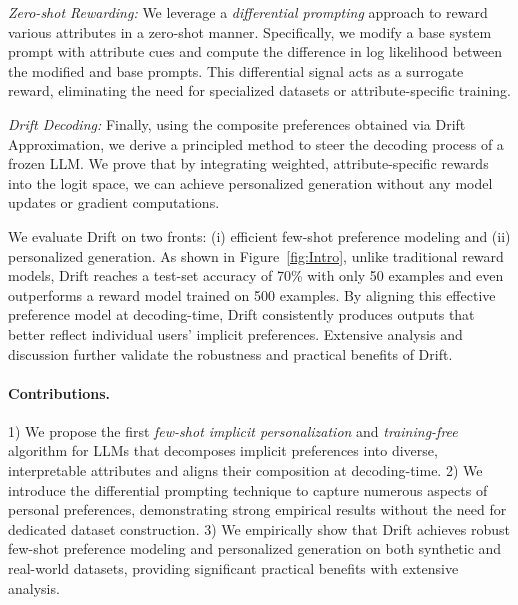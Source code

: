 \noindent \textit{Zero-shot Rewarding:} We leverage a \textit{differential prompting} approach to reward various attributes in a zero-shot manner. Specifically, we modify a base system prompt with attribute cues and compute the difference in log likelihood between the modified and base prompts. This differential signal acts as a surrogate reward, eliminating the need for specialized datasets or attribute-specific training.

\noindent
\textit{Drift Decoding:} Finally, using the composite preferences obtained via Drift Approximation, we derive a principled method to steer the decoding process of a frozen LLM. We prove that by integrating weighted, attribute-specific rewards into the logit space, we can achieve personalized generation without any model updates or gradient computations. 

We evaluate Drift on two fronts: (i) efficient few-shot preference modeling and (ii) personalized generation. As shown in Figure~\ref{fig:Intro}, unlike traditional reward models, Drift reaches a test-set accuracy of 70\% with only 50 examples and even outperforms a reward model trained on 500 examples. By aligning this effective preference model at decoding-time, Drift consistently produces outputs that better reflect individual users’ implicit preferences.
Extensive analysis and discussion further validate the robustness and practical benefits of Drift.



\paragraph{Contributions.}
1) We propose the first \textit{few-shot implicit personalization} and \textit{training-free} algorithm for LLMs that decomposes implicit preferences into diverse, interpretable attributes and aligns their composition at decoding-time. 2) We introduce the differential prompting technique to capture numerous aspects of personal preferences, demonstrating strong empirical results without the need for dedicated dataset construction. 3) We empirically show that Drift achieves robust few-shot preference modeling and personalized generation on both synthetic and real-world datasets, providing significant practical benefits with extensive analysis.